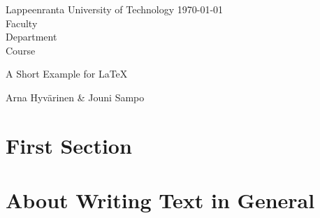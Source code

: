 \documentclass[12pt, titlepage, a4paper]{article}  %
\begin{document}

\noindent       %
Lappeenranta University of Technology \hfill{\today} \\   %
Faculty \\
Department \\
Course \\

\begin{center}
\begin{minipage}{.65\textwidth}    %

\Huge{A Short Example for \LaTeX}

\end{minipage}
\end{center}

{\hfill Arna Hyv{\"a}rinen \& Jouni Sampo}       %

\newpage       %

\tableofcontents    %

\newpage


\section{First Section}

\section{About Writing Text in General}    %
\end{document}

